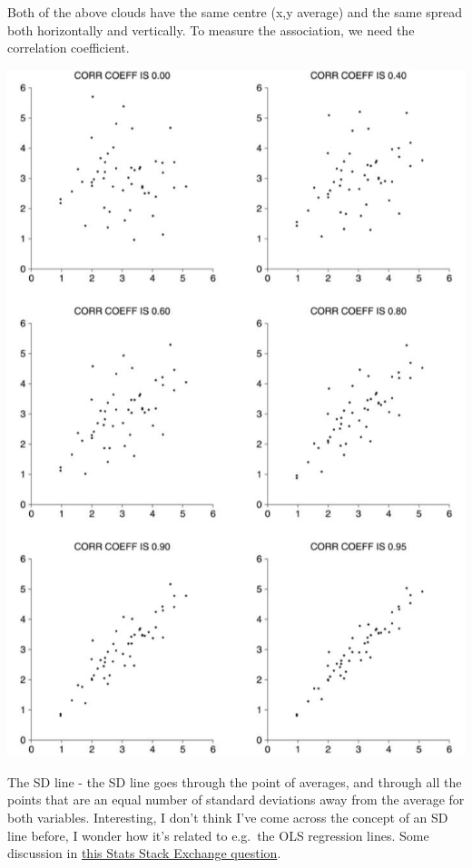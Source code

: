 \documentclass[
]{book}
\begin{document}
Both of the above clouds have the same centre (x,y average) and the same spread both horizontally and vertically. To measure the association, we need the correlation coefficient.

\includegraphics{images/Ch08Img03.png}

The SD line - the SD line goes through the point of averages, and through all the points that are an equal number of standard deviations away from the average for both variables. Interesting, I don't think I've come across the concept of an SD line before, I wonder how it's related to e.g.~the OLS regression lines. Some discussion in \href{https://stats.stackexchange.com/questions/446497/whats-the-added-value-of-sd-line-over-regression-line-when-examining-associatio}{this Stats Stack Exchange question}.
\end{document}
